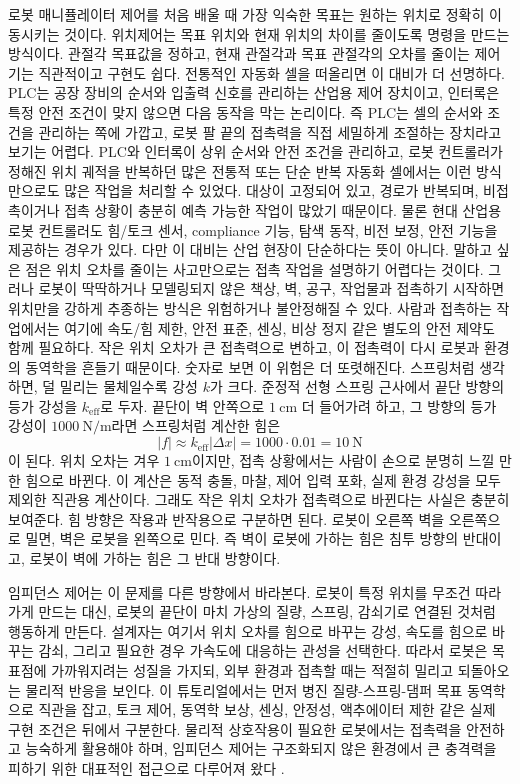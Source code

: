 로봇 매니퓰레이터 제어를 처음 배울 때 가장 익숙한 목표는 원하는 위치로 정확히 이동시키는 것이다.
위치제어는 목표 위치와 현재 위치의 차이를 줄이도록 명령을 만드는 방식이다.
관절각 목표값을 정하고, 현재 관절각과 목표 관절각의 오차를 줄이는 제어기는 직관적이고 구현도 쉽다.
전통적인 자동화 셀을 떠올리면 이 대비가 더 선명하다.
PLC는 공장 장비의 순서와 입출력 신호를 관리하는 산업용 제어 장치이고, 인터록은 특정 안전 조건이 맞지 않으면 다음 동작을 막는 논리이다.
즉 PLC는 셀의 순서와 조건을 관리하는 쪽에 가깝고, 로봇 팔 끝의 접촉력을 직접 세밀하게 조절하는 장치라고 보기는 어렵다.
PLC와 인터록이 상위 순서와 안전 조건을 관리하고, 로봇 컨트롤러가 정해진 위치 궤적을 반복하던 많은 전통적 또는 단순 반복 자동화 셀에서는 이런 방식만으로도 많은 작업을 처리할 수 있었다.
대상이 고정되어 있고, 경로가 반복되며, 비접촉이거나 접촉 상황이 충분히 예측 가능한 작업이 많았기 때문이다.
물론 현대 산업용 로봇 컨트롤러도 힘/토크 센서, compliance 기능, 탐색 동작, 비전 보정, 안전 기능을 제공하는 경우가 있다.
다만 이 대비는 산업 현장이 단순하다는 뜻이 아니다.
말하고 싶은 점은 위치 오차를 줄이는 사고만으로는 접촉 작업을 설명하기 어렵다는 것이다.
그러나 로봇이 딱딱하거나 모델링되지 않은 책상, 벽, 공구, 작업물과 접촉하기 시작하면 위치만을 강하게 추종하는 방식은 위험하거나 불안정해질 수 있다.
사람과 접촉하는 작업에서는 여기에 속도/힘 제한, 안전 표준, 센싱, 비상 정지 같은 별도의 안전 제약도 함께 필요하다.
작은 위치 오차가 큰 접촉력으로 변하고, 이 접촉력이 다시 로봇과 환경의 동역학을 흔들기 때문이다.
숫자로 보면 이 위험은 더 또렷해진다.
스프링처럼 생각하면, 덜 밀리는 물체일수록 강성 $k$가 크다.
준정적 선형 스프링 근사에서 끝단 방향의 등가 강성을 $k_{\mathrm{eff}}$로 두자.
끝단이 벽 안쪽으로 $1~\mathrm{cm}$ 더 들어가려 하고, 그 방향의 등가 강성이 $1000~\mathrm{N/m}$라면 스프링처럼 계산한 힘은
\begin{equation}
  |f|\approx k_{\mathrm{eff}}|\Delta x|=1000\cdot0.01=10~\mathrm{N}
\end{equation}
이 된다.
위치 오차는 겨우 $1~\mathrm{cm}$이지만, 접촉 상황에서는 사람이 손으로 분명히 느낄 만한 힘으로 바뀐다.
이 계산은 동적 충돌, 마찰, 제어 입력 포화, 실제 환경 강성을 모두 제외한 직관용 계산이다.
그래도 작은 위치 오차가 접촉력으로 바뀐다는 사실은 충분히 보여준다.
힘 방향은 작용과 반작용으로 구분하면 된다.
로봇이 오른쪽 벽을 오른쪽으로 밀면, 벽은 로봇을 왼쪽으로 민다.
즉 벽이 로봇에 가하는 힘은 침투 방향의 반대이고, 로봇이 벽에 가하는 힘은 그 반대 방향이다.

임피던스 제어는 이 문제를 다른 방향에서 바라본다.
로봇이 특정 위치를 무조건 따라가게 만드는 대신, 로봇의 끝단이 마치 가상의 질량, 스프링, 감쇠기로 연결된 것처럼 행동하게 만든다.
설계자는 여기서 위치 오차를 힘으로 바꾸는 강성, 속도를 힘으로 바꾸는 감쇠, 그리고 필요한 경우 가속도에 대응하는 관성을 선택한다.
따라서 로봇은 목표점에 가까워지려는 성질을 가지되, 외부 환경과 접촉할 때는 적절히 밀리고 되돌아오는 물리적 반응을 보인다.
이 튜토리얼에서는 먼저 병진 질량-스프링-댐퍼 목표 동역학으로 직관을 잡고, 토크 제어, 동역학 보상, 센싱, 안정성, 액추에이터 제한 같은 실제 구현 조건은 뒤에서 구분한다.
물리적 상호작용이 필요한 로봇에서는 접촉력을 안전하고 능숙하게 활용해야 하며, 임피던스 제어는 구조화되지 않은 환경에서 큰 충격력을 피하기 위한 대표적인 접근으로 다루어져 왔다 \cite{abudakka2020variableimpedance}.

